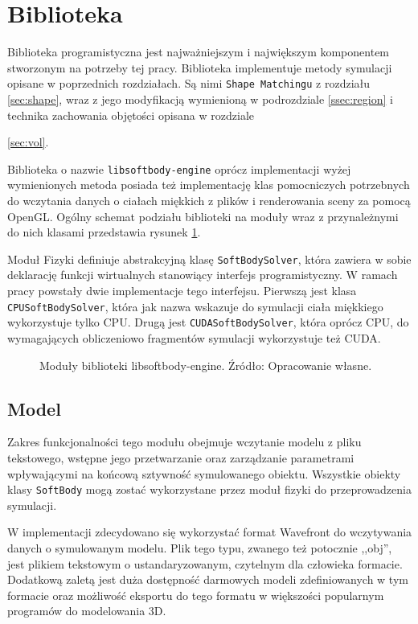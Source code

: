 \section{Biblioteka}
Biblioteka programistyczna jest najważniejszym i największym komponentem
stworzonym na potrzeby tej pracy. Biblioteka
implementuje metody symulacji opisane w poprzednich rozdziałach. Są nimi
\texttt{Shape Matchingu} z rozdziału \ref{sec:shape}, wraz z jego modyfikacją
wymienioną w podrozdziale \ref{ssec:region} i technika zachowania objętości
opisana w rozdziale {\ref{sec:vol}. 

Biblioteka o nazwie \texttt{libsoftbody-engine} oprócz implementacji wyżej
wymienionych metoda posiada też implementację klas pomocniczych potrzebnych
do wczytania danych o ciałach miękkich z plików i renderowania sceny za
pomocą OpenGL. Ogólny schemat podziału biblioteki na moduły wraz z
przynależnymi do nich klasami przedstawia rysunek \ref{libsoftbody}.

Moduł Fizyki definiuje abstrakcyjną klasę \texttt{SoftBodySolver}, która
zawiera w sobie deklarację funkcji wirtualnych stanowiący interfejs
programistyczny. W ramach pracy powstały dwie implementacje tego interfejsu.
Pierwszą jest klasa \texttt{CPUSoftBodySolver}, która jak nazwa wskazuje do
symulacji ciała miękkiego wykorzystuje tylko CPU. Drugą jest
\texttt{CUDASoftBodySolver}, która oprócz CPU, do wymagających obliczeniowo
fragmentów symulacji wykorzystuje też CUDA.

\begin{figure}[H]
\centering

\caption{Moduły biblioteki libsoftbody-engine. Źródło: Opracowanie własne.}
\label{libsoftbody}
\end{figure}

\subsection{Model}
Zakres funkcjonalności tego modułu obejmuje
wczytanie modelu z pliku tekstowego, wstępne jego przetwarzanie oraz
zarządzanie parametrami wpływającymi na końcową sztywność symulowanego obiektu.
Wszystkie obiekty klasy \texttt{SoftBody} mogą zostać wykorzystane przez moduł fizyki do
przeprowadzenia symulacji.

W implementacji zdecydowano się wykorzystać format Wavefront \cite{obj} do
wczytywania danych o symulowanym modelu. Plik tego typu,
zwanego też potocznie ,,obj'', jest plikiem tekstowym o ustandaryzowanym,
czytelnym dla człowieka formacie. Dodatkową zaletą jest duża dostępność
darmowych modeli zdefiniowanych w tym formacie oraz możliwość eksportu do
tego formatu w większości popularnym programów do modelowania 3D.

}
